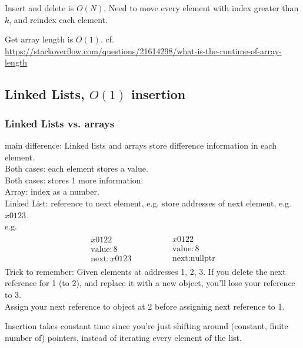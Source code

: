 \documentclass[10pt]{amsart}
\begin{document}
\begin{multicols*}{2}
Insert and delete is $O(N)$. Need to move every element with index greater than $k$, and reindex each element.

Get array length is $O(1)$. cf. \url{https://stackoverflow.com/questions/21614298/what-is-the-runtime-of-array-length} 

\subsection{Linked Lists, $O(1)$ insertion}

\subsubsection{Linked Lists vs. arrays}

main difference: Linked lists and arrays store difference information in each element. \\

Both cases: each element stores a value. \\
Both cases: stores 1 more information. \\

Array: index as a number. \\
Linked List: reference to next element, e.g. store addresses of next element, e.g. $x0123$ \\
e.g.
\[
\begin{gathered}
\begin{gathered}
x0122 \\
\text{value}: 8 \\
\text{next}: x0123
\end{gathered} \qquad \qquad \, 
\begin{gathered}
x0122 \\
\text{value}: 8 \\
\text{next}: \text{nullptr}
\end{gathered}
\end{gathered}
\]
Trick to remember: Given elements at addresses 1, 2, 3. If you delete the next reference for 1 (to 2), and replace it with a new object, you'll lose your reference to 3. \\
Assign your next reference to object at 2 before assigning next reference to 1.

Insertion takes constant time since you're just shifting around (constant, finite number of) pointers, instead of iterating every element of the list.


\end{multicols*}
\end{document}
